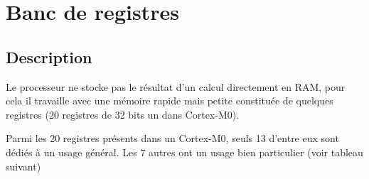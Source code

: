 \documentclass{article}
\begin{document}
    \section{Banc de registres}
    \label{sec:BDR}

    \subsection{Description}

    Le processeur ne stocke pas le résultat d'un calcul directement en RAM, pour cela il travaille avec une mémoire rapide mais petite constituée de quelques registres (20 registres de 32 bits un dans Cortex-M0).

    Parmi les 20 registres présents dans un Cortex-M0, seuls 13 d'entre eux sont dédiés à un usage général.
    Les 7 autres ont un usage bien particulier (voir tableau suivant)

    \vspace{1em}
\end{document}
